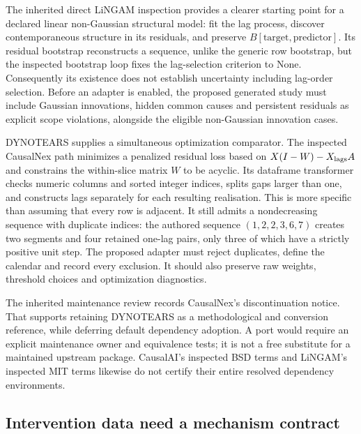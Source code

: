 The inherited direct LiNGAM inspection provides a clearer starting point
for a declared linear non-Gaussian structural model: fit the lag process,
discover contemporaneous structure in its residuals, and preserve
$B[\text{target},\text{predictor}]$. Its residual bootstrap reconstructs
a sequence, unlike the generic row bootstrap, but the inspected bootstrap
loop fixes the lag-selection criterion to None. Consequently its existence
does not establish uncertainty including lag-order selection. Before an
adapter is enabled, the proposed generated study must include Gaussian
innovations, hidden common causes and persistent residuals as explicit
scope violations, alongside the eligible non-Gaussian innovation cases.
\citep{v131_sw_lingam,exec13_pydisc_lingam,exec14_pt_contract}

DYNOTEARS supplies a simultaneous optimization comparator. The inspected
CausalNex path minimizes a penalized residual loss based on
$X(I-W)-X_{\rm lags}A$ and constrains the within-slice matrix $W$ to be
acyclic. Its dataframe transformer checks numeric columns and sorted integer
indices, splits gaps larger than one, and constructs lags separately for
each resulting realisation. This is more specific than assuming that every
row is adjacent. It still admits a nondecreasing sequence with duplicate
indices: the authored sequence $(1,2,2,3,6,7)$ creates two segments and four
retained one-lag pairs, only three of which have a strictly positive unit
step. The proposed adapter must reject duplicates, define the calendar and
record every exclusion. It should also preserve raw weights, threshold
choices and optimization diagnostics.
\citep{exec14_pt_causalnex,exec14_pt_exact,exec14_pt_paper_dynotears}

The inherited maintenance review records CausalNex's discontinuation notice.
That supports retaining DYNOTEARS as a methodological and conversion
reference, while deferring default dependency adoption. A port would require
an explicit maintenance owner and equivalence tests; it is not a free
substitute for a maintained upstream package. CausalAI's inspected BSD terms
and LiNGAM's inspected MIT terms likewise do not certify their entire
resolved dependency environments. \citep{exec14_causalnex_primary,
exec14_pt_causalai,exec13_pydisc_lingam,exec14_pt_contract}

\subsection{Intervention data need a mechanism contract}


